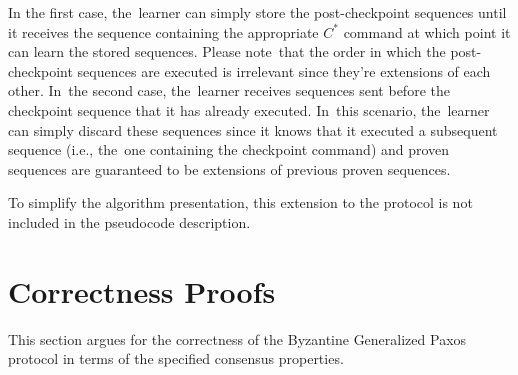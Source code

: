 \documentclass[algorithms,article,accept,moreauthors,pdftex,10pt,a4paper]{Definitions/mdpi}
\begin{document}
In the first case, the~learner can simply store the post-checkpoint sequences until it receives the sequence containing the appropriate $C^*$ command at which point it can learn the stored sequences. Please note~that the order in which the post-checkpoint sequences are executed is irrelevant since they're extensions of each other. In~the second case, the~learner receives sequences sent before the checkpoint sequence that it has already executed. In~this scenario, the~learner can simply discard these sequences since it knows that it executed a subsequent sequence (i.e., the~one containing the checkpoint command) and proven sequences are guaranteed to be extensions of previous proven sequences. \par
To simplify the algorithm presentation, this extension to the protocol is not included in the pseudocode description.

%
\section{Correctness Proofs} \label{bft_proof}

This section argues for the correctness of the Byzantine Generalized Paxos protocol in terms of the specified consensus properties.\par
\end{document}

